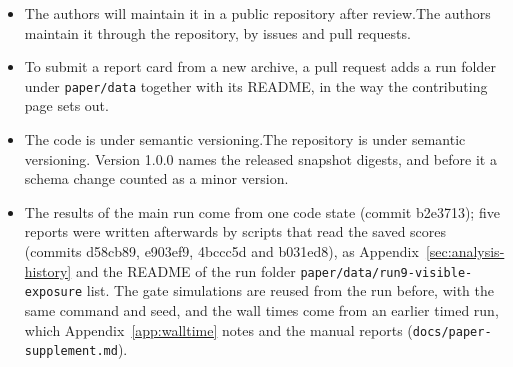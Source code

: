 \begin{itemize}
\item \iftmlr The authors will maintain it in a public repository after review.\else The authors maintain it through the repository, by issues and pull requests.\fi
\item To submit a report card from a new archive, a pull request adds a run folder under \texttt{paper/data} together with its README, in the way the contributing page sets out.
\item \iftmlr The code is under semantic versioning.\else The repository is under semantic versioning. Version 1.0.0 names the released snapshot digests, and before it a schema change counted as a minor version.\fi
\item The results of the main run come from one code state\iftmlr\else{} (commit b2e3713)\fi; five reports were written afterwards by scripts that read the saved scores\iftmlr\else{} (commits d58cb89, e903ef9, 4bccc5d and b031ed8)\fi, as Appendix~\ref{sec:analysis-history} and the README of the run folder \texttt{paper/data/run9-visible-exposure} list. The gate simulations are reused from the run before, with the same command and seed, and the wall times come from an earlier timed run, which Appendix~\ref{app:walltime} notes and the manual reports (\texttt{docs/paper-supplement.md}).

\end{itemize}

